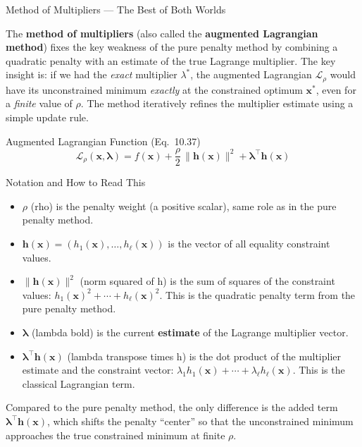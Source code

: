 \documentclass[aspectratio=169,10pt]{beamer}
\newcommand{\bx}{\mathbf{x}}
\newcommand{\blambda}{\bm{\lambda}}
\newcommand{\Lagr}{\mathcal{L}}
\begin{document}
\begin{frame}[allowframebreaks]{Method of Multipliers --- The Best of Both Worlds}

  The \textbf{method of multipliers} (also called the \textbf{augmented
  Lagrangian method}) fixes the key weakness of the pure penalty method by
  combining a quadratic penalty with an estimate of the true Lagrange
  multiplier.  The key insight is: if we had the \emph{exact} multiplier
  $\lambda^*$, the augmented Lagrangian $\Lagr_\rho$ would have its
  unconstrained minimum \emph{exactly} at the constrained optimum $\bx^*$,
  even for a \emph{finite} value of $\rho$.  The method iteratively refines
  the multiplier estimate using a simple update rule.

  \begin{block}{Augmented Lagrangian Function (Eq.~10.37)}
    \[
      \Lagr_\rho(\bx, \blambda)
        = f(\bx)
          + \frac{\rho}{2}\,\|\mathbf{h}(\bx)\|^2
          + \blambda^\top \mathbf{h}(\bx)
    \]
  \end{block}

  \begin{block}{Notation and How to Read This}
    \begin{itemize}
      \item $\rho$ (rho) is the penalty weight (a positive scalar), same role as
            in the pure penalty method.
      \item $\mathbf{h}(\bx) = (h_1(\bx), \ldots, h_\ell(\bx))$ is the vector
            of all equality constraint values.
      \item $\|\mathbf{h}(\bx)\|^2$ (norm squared of h) is the sum of squares
            of the constraint values: $h_1(\bx)^2 + \cdots + h_\ell(\bx)^2$.
            This is the quadratic penalty term from the pure penalty method.
      \item $\blambda$ (lambda bold) is the current \textbf{estimate} of the
            Lagrange multiplier vector.
      \item $\blambda^\top \mathbf{h}(\bx)$ (lambda transpose times h) is
            the dot product of the multiplier estimate and the constraint vector:
            $\lambda_1 h_1(\bx) + \cdots + \lambda_\ell h_\ell(\bx)$.  This is
            the classical Lagrangian term.
    \end{itemize}
    Compared to the pure penalty method, the only difference is the added term
    $\blambda^\top \mathbf{h}(\bx)$, which shifts the penalty ``center'' so
    that the unconstrained minimum approaches the true constrained minimum at
    finite $\rho$.
  \end{block}


\end{frame}
\end{document}

